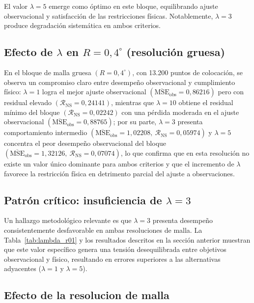 El valor $\lambda = 5$ emerge como óptimo en este bloque, equilibrando ajuste observacional y satisfacción de las restricciones físicas. Notablemente, $\lambda = 3$ produce degradación sistemática en ambos criterios.

\subsection{Efecto de \texorpdfstring{$\lambda$ en $R=0{,}4^{\circ}$}{lambda en R=0,4 grados} (resolución gruesa)}

En el bloque de malla gruesa \((R=0{,}4^{\circ})\), con 13.200 puntos de colocación, se observa un compromiso claro entre desempeño observacional y cumplimiento físico: $\lambda=1$ logra el mejor ajuste observacional $\left(\overline{\text{MSE}}_{\text{obs}}=0{,}86216\right)$ pero con residual elevado $\left(\mathcal{R}_{\text{NS}}=0{,}24141\right)$, mientras que $\lambda=10$ obtiene el residual mínimo del bloque $\left(\mathcal{R}_{\text{NS}}=0{,}02242\right)$ con una pérdida moderada en el ajuste observacional $\left(\overline{\text{MSE}}_{\text{obs}}=0{,}88765\right)$; por su parte, $\lambda=3$ presenta comportamiento intermedio $\left(\overline{\text{MSE}}_{\text{obs}}=1{,}02208,\ \mathcal{R}_{\text{NS}}=0{,}05974\right)$ y $\lambda=5$ concentra el peor desempeño observacional del bloque $\left(\overline{\text{MSE}}_{\text{obs}}=1{,}32126,\ \mathcal{R}_{\text{NS}}=0{,}07074\right)$, lo que confirma que en esta resolución no existe un valor único dominante para ambos criterios y que el incremento de $\lambda$ favorece la restricción física en detrimento parcial del ajuste a observaciones.

\subsection{Patrón crítico: insuficiencia de \texorpdfstring{$\lambda = 3$}{lambda = 3}}

Un hallazgo metodológico relevante es que $\lambda = 3$ presenta desempeño consistentemente desfavorable en ambas resoluciones de malla. La Tabla~\ref{tab:lambda_r01} y los resultados descritos en la sección anterior muestran que este valor específico genera una tensión desequilibrada entre objetivos observacional y físico, resultando en errores superiores a las alternativas adyacentes ($\lambda = 1$ y $\lambda = 5$).

\subsection{Efecto de la resolucion de malla}

